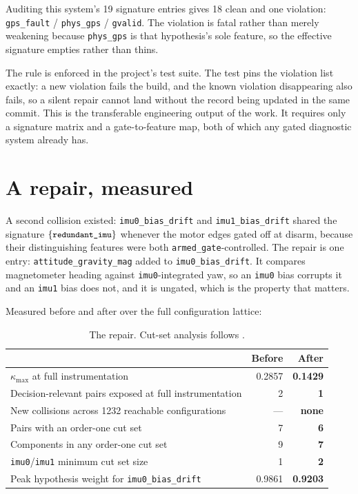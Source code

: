 \documentclass[11pt,a4paper]{article}
\newcommand{\code}[1]{\texttt{\small #1}}
\begin{document}
Auditing this system's 19 signature entries gives 18 clean and one violation:
\code{gps\_fault} / \code{phys\_gps} / \code{gvalid}. The violation is fatal
rather than merely weakening because \code{phys\_gps} is that hypothesis's sole
feature, so the effective signature empties rather than thins.

The rule is enforced in the project's test suite. The test pins the violation
list exactly: a new violation fails the build, and the known violation
disappearing also fails, so a silent repair cannot land without the record
being updated in the same commit. This is the transferable engineering output
of the work. It requires only a signature matrix and a gate-to-feature map,
both of which any gated diagnostic system already has.

\section{A repair, measured}
\label{sec:repair}

A second collision existed: \code{imu0\_bias\_drift} and
\code{imu1\_bias\_drift} shared the signature $\{\code{redundant\_imu}\}$
whenever the motor edges gated off at disarm, because their distinguishing
features were both \code{armed\_gate}-controlled. The repair is one entry:
\code{attitude\_gravity\_mag} added to \code{imu0\_bias\_drift}. It compares
magnetometer heading against \code{imu0}-integrated yaw, so an \code{imu0}
bias corrupts it and an \code{imu1} bias does not, and it is ungated, which is
the property that matters.

Measured before and after over the full configuration lattice:

\begin{table}[h]
\centering
\small
\begin{tabular}{lrr}
\toprule
& Before & After \\
\midrule
$\kappa_{\max}$ at full instrumentation & 0.2857 & \textbf{0.1429} \\
Decision-relevant pairs exposed at full instrumentation & 2 & \textbf{1} \\
New collisions across 1232 reachable configurations & --- & \textbf{none} \\
Pairs with an order-one cut set & 7 & \textbf{6} \\
Components in any order-one cut set & 9 & \textbf{7} \\
\code{imu0}/\code{imu1} minimum cut set size & 1 & \textbf{2} \\
Peak hypothesis weight for \code{imu0\_bias\_drift} & 0.9861 & \textbf{0.9203} \\
\bottomrule
\end{tabular}
\caption{The repair. Cut-set analysis follows
\cite{hurdle2007faulttree,reeves2019sensorselection}.}
\end{table}
\end{document}
